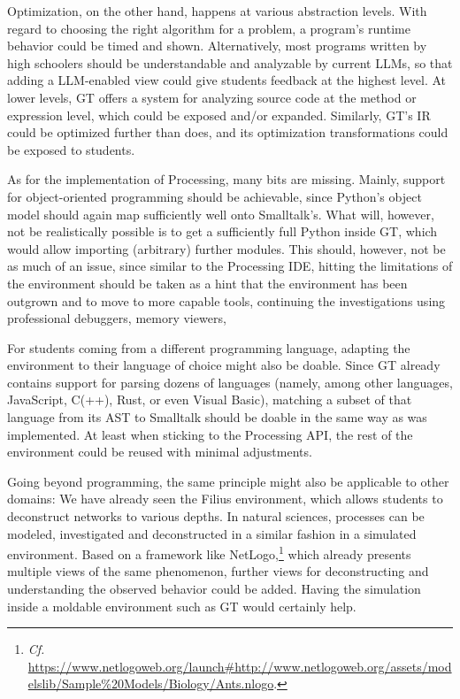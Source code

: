 Optimization, on the other hand, happens at various abstraction levels. With regard to choosing the right algorithm for a problem, a program's runtime behavior could be timed and shown. Alternatively, most programs written by high schoolers should be understandable and analyzable by current \acp{LLM}, so that adding a \ac{LLM}-enabled view could give students feedback at the highest level. At lower levels, \ac{GT} offers a  system for analyzing source code at the method or expression level, which could be exposed and/or expanded. Similarly, \ac{GT}'s \ac{IR} could be optimized further than  does, and its optimization transformations could be exposed to students.

As for the implementation of Processing, many bits are missing. Mainly, support for object-oriented programming should be achievable, since Python's object model should again map sufficiently well onto Smalltalk's. What will, however, not be realistically possible is to get a sufficiently full Python inside \ac{GT}, which would allow importing (arbitrary) further modules. This should, however, not be as much of an issue, since similar to the Processing \ac{IDE}, hitting the limitations of the environment should be taken as a hint that the environment has been outgrown and to move to more capable tools, continuing the investigations using professional debuggers, memory viewers, \etc

For students coming from a different programming language, adapting the environment to their language of choice might also be doable. Since \ac{GT} already contains support for parsing dozens of languages (namely, among other languages, JavaScript, C(++), Rust, or even Visual Basic), matching a subset of that language from its \ac{AST} to Smalltalk should be doable in the same way as  was implemented. At least when sticking to the Processing \ac{API}, the rest of the environment could be reused with minimal adjustments.

Going beyond programming, the same principle might also be applicable to other domains: We have already seen the Filius environment, which allows students to deconstruct networks to various depths. In natural sciences, processes can be modeled, investigated and deconstructed in a similar fashion in a simulated environment. Based on a framework like NetLogo,\footnote{\emph{Cf.} \eg \url{https://www.netlogoweb.org/launch\#http://www.netlogoweb.org/assets/modelslib/Sample\%20Models/Biology/Ants.nlogo}.} which already presents multiple views of the same phenomenon, further views for deconstructing and understanding the observed behavior could be added. Having the simulation inside a moldable environment such as \ac{GT} would certainly help.

